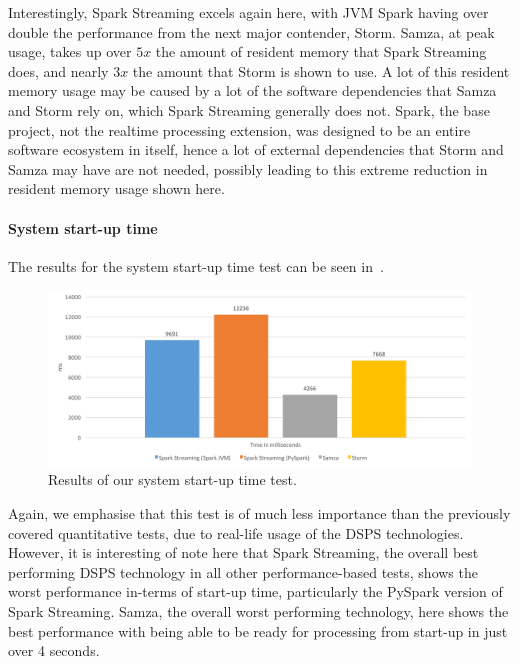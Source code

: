 Interestingly, Spark Streaming excels again here, with JVM Spark having over double the performance from the next major
contender, Storm. Samza, at peak usage, takes up over $5x$ the amount of resident memory that Spark Streaming does, and
nearly $3x$ the amount that Storm is shown to use. A lot of this resident memory usage may be caused by a lot of the
software dependencies that Samza and Storm rely on, which Spark Streaming generally does not. Spark, the base project,
not the realtime processing extension, was designed to be an entire software ecosystem in itself, hence a lot of external
dependencies that Storm and Samza may have are not needed, possibly leading to this extreme reduction in resident memory
usage shown here.

\paragraph{System start-up time}

The results for the system start-up time test can be seen in~.

\begin{figure}[H]
  \centering
  \includegraphics[width=1\textwidth]{includes/figures/fig_startup_time_res}
  \caption{Results of our system start-up time test.}
  \label{fig:pipeline_whole}
\end{figure}

Again, we emphasise that this test is of much less importance than the previously covered quantitative tests, due to real-life usage
of the DSPS technologies. However, it is interesting of note here that Spark Streaming, the overall best performing
DSPS technology in all other performance-based tests, shows the worst performance in-terms of start-up time, particularly
the PySpark version of Spark Streaming. Samza, the overall worst performing technology, here shows the best performance
with being able to be ready for processing from start-up in just over 4 seconds.

